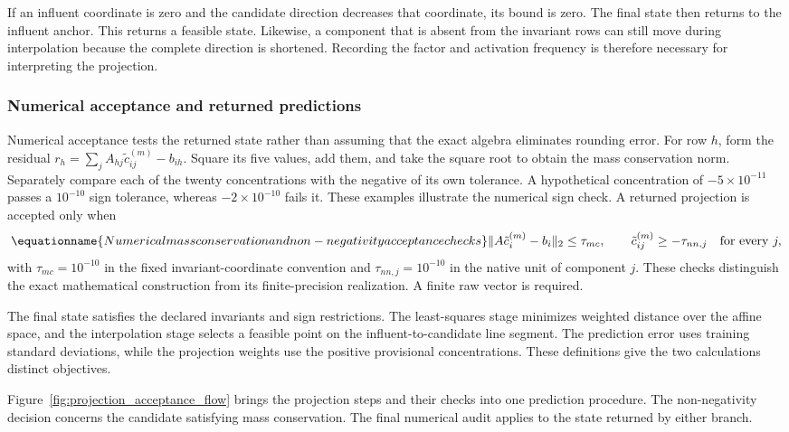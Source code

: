 If an influent coordinate is zero and the candidate direction decreases that coordinate, its bound is zero. The final state then returns to the influent anchor. This returns a feasible state. Likewise, a component that is absent from the invariant rows can still move during interpolation because the complete direction is shortened. Recording the factor and activation frequency is therefore necessary for interpreting the projection.

\subsubsection{Numerical acceptance and returned predictions}

Numerical acceptance tests the returned state rather than assuming that the exact algebra eliminates rounding error. For row $h$, form the residual $r_h=\sum_jA_{hj}\tilde c_{ij}^{(m)}-b_{ih}$. Square its five values, add them, and take the square root to obtain the mass conservation norm. Separately compare each of the twenty concentrations with the negative of its own tolerance. A hypothetical concentration of $-5\times10^{-11}$ passes a $10^{-10}$ sign tolerance, whereas $-2\times10^{-10}$ fails it. These examples illustrate the numerical sign check. A returned projection is accepted only when
\begin{equation}
\equationname{Numerical mass conservation and non-negativity acceptance checks}
\|A\tilde c_i^{(m)}-b_i\|_2\leq\tau_{mc},\qquad
\tilde c_{ij}^{(m)}\geq-\tau_{nn,j}\quad\text{for every }j,
\label{eq:projection_numerical_acceptance}
\end{equation}
with $\tau_{mc}=10^{-10}$ in the fixed invariant-coordinate convention and $\tau_{nn,j}=10^{-10}$ in the native unit of component $j$. These checks distinguish the exact mathematical construction from its finite-precision realization. A finite raw vector is required.

The final state satisfies the declared invariants and sign restrictions. The least-squares stage minimizes weighted distance over the affine space, and the interpolation stage selects a feasible point on the influent-to-candidate line segment. The prediction error uses training standard deviations, while the projection weights use the positive provisional concentrations. These definitions give the two calculations distinct objectives.

Figure~\ref{fig:projection_acceptance_flow} brings the projection steps and their checks into one prediction procedure. The non-negativity decision concerns the candidate satisfying mass conservation. The final numerical audit applies to the state returned by either branch.

